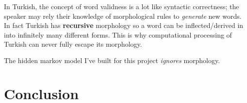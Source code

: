 \documentclass{article}
\begin{document}
In Turkish, the concept of word validness is a lot like syntactic correctness;
the speaker may rely their knowledge of morphological rules to \emph{generate}
new words. In fact Turkish has \textbf{recursive} morphology \citep{kabak2001}
so a word can be inflected/derived in into infinitely many different forms. This
is why computational processing of Turkish can never fully escape its
morphology.

The hidden markov model I've built for this project \emph{ignores} morphology.

\section{Conclusion}





\end{document}
